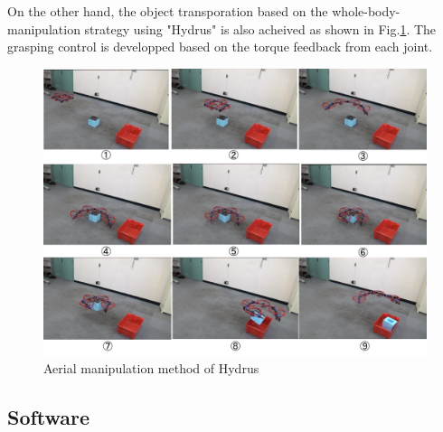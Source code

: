 \documentclass{standalone}
\begin{document}
On the other hand, the object transporation based on the whole-body-manipulation strategy using "Hydrus" is also acheived as shown in Fig.\ref{fig:task3-hydrus-manipulation}. The grasping control is developped  based on the torque feedback from each joint. 

\begin{figure}[h]
  \begin{center}
    \includegraphics[clip,  bb=0 0 720 540,  width=\columnwidth]{sections/task3/images/task3-hydrus-manipulation.pdf}
    \caption{Aerial manipulation method of Hydrus}
    \label{fig:task3-hydrus-manipulation}
  \end{center}
\end{figure} 

\subsection{Software}
\end{document}

